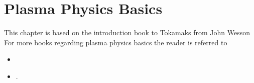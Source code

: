 
\chapter{Plasma Physics Basics}
\label{chap:plasmaPhysics}

\thispagestyle{empty}
\newpage

This chapter is based on the introduction book to Tokamaks from John Wesson\cite{Wesson2004} For more books regarding plasma physics basics the reader is referred to
\begin{itemize}
    \item {}
    \item {}.
\end{itemize}